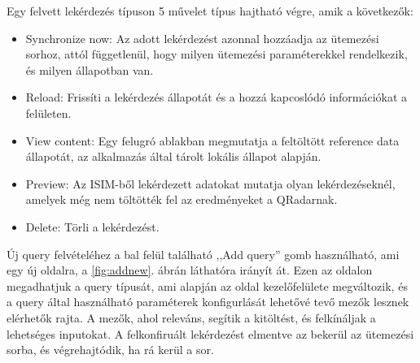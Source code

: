 Egy felvett lekérdezés típuson 5 művelet típus hajtható végre, amik a következők:
\begin{itemize}
	\item Synchronize now: Az adott lekérdezést azonnal hozzáadja az ütemezési sorhoz, attól függetlenül, hogy milyen ütemezési paraméterekkel rendelkezik, és milyen állapotban van.
	\item Reload: Frissíti a lekérdezés állapotát és a hozzá kapcoslódó információkat a felületen.
	\item View content: Egy felugró ablakban megmutatja a feltöltött reference data állapotát, az alkalmazás által tárolt lokális állapot alapján.
	\item Preview: Az ISIM-ből lekérdezett adatokat mutatja olyan lekérdezéseknél, amelyek még nem töltötték fel az eredményeket a QRadarnak.
	\item Delete: Törli a lekérdezést.
\end{itemize}

Új query felvételéhez a bal felül található ,,Add query'' gomb használható, ami egy új oldalra, a \ref{fig:addnew}. ábrán láthatóra irányít át. Ezen az oldalon megadhatjuk a query típusát, ami alapján az oldal kezelőfelülete megváltozik, és a query által használható paraméterek konfigurlását lehetővé tevő mezők lesznek elérhetők rajta. A mezők, ahol releváns, segítik a kitöltést, és felkínáljak a lehetséges inputokat. A felkonfiruált lekérdezést elmentve az bekerül az ütemezési sorba, és végrehajtódik, ha rá kerül a sor.




